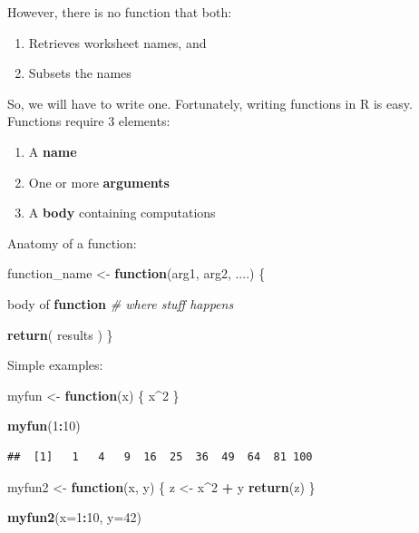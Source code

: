 \documentclass[
]{book}
\newenvironment{Shaded}{\begin{snugshade}}{\end{snugshade}}
\newcommand{\CommentTok}[1]{\textcolor[rgb]{0.56,0.35,0.01}{\textit{#1}}}
\newcommand{\ControlFlowTok}[1]{\textcolor[rgb]{0.13,0.29,0.53}{\textbf{#1}}}
\newcommand{\DataTypeTok}[1]{\textcolor[rgb]{0.13,0.29,0.53}{#1}}
\newcommand{\DecValTok}[1]{\textcolor[rgb]{0.00,0.00,0.81}{#1}}
\newcommand{\KeywordTok}[1]{\textcolor[rgb]{0.13,0.29,0.53}{\textbf{#1}}}
\newcommand{\NormalTok}[1]{#1}
\newcommand{\OperatorTok}[1]{\textcolor[rgb]{0.81,0.36,0.00}{\textbf{#1}}}
\newcommand{\StringTok}[1]{\textcolor[rgb]{0.31,0.60,0.02}{#1}}
\providecommand{\tightlist}{%
  \setlength{\itemsep}{0pt}\setlength{\parskip}{0pt}}
\begin{document}
However, there is no function that both:

\begin{enumerate}
\def\labelenumi{\arabic{enumi}.}
\tightlist
\item
  Retrieves worksheet names, and
\item
  Subsets the names
\end{enumerate}

So, we will have to write one. Fortunately, writing functions in R is easy.
Functions require 3 elements:

\begin{enumerate}
\def\labelenumi{\arabic{enumi}.}
\tightlist
\item
  A \textbf{name}
\item
  One or more \textbf{arguments}
\item
  A \textbf{body} containing computations
\end{enumerate}

Anatomy of a function:

\begin{Shaded}
\begin{Highlighting}[]
\NormalTok{function\_name \textless{}{-}}\StringTok{ }\ControlFlowTok{function}\NormalTok{(arg1, arg2, ....) \{}
  
\NormalTok{    body of }\ControlFlowTok{function} \CommentTok{\# where stuff happens }

    \KeywordTok{return}\NormalTok{( results ) }
\NormalTok{\}}
\end{Highlighting}
\end{Shaded}

Simple examples:

\begin{Shaded}
\begin{Highlighting}[]
\NormalTok{myfun \textless{}{-}}\StringTok{ }\ControlFlowTok{function}\NormalTok{(x) \{}
\NormalTok{  x}\OperatorTok{\^{}}\DecValTok{2}
\NormalTok{\}}

\KeywordTok{myfun}\NormalTok{(}\DecValTok{1}\OperatorTok{:}\DecValTok{10}\NormalTok{)}
\end{Highlighting}
\end{Shaded}

\begin{verbatim}
##  [1]   1   4   9  16  25  36  49  64  81 100
\end{verbatim}

\begin{Shaded}
\begin{Highlighting}[]
\NormalTok{myfun2 \textless{}{-}}\StringTok{ }\ControlFlowTok{function}\NormalTok{(x, y) \{}
\NormalTok{  z \textless{}{-}}\StringTok{ }\NormalTok{x}\OperatorTok{\^{}}\DecValTok{2} \OperatorTok{+}\StringTok{ }\NormalTok{y}
  \KeywordTok{return}\NormalTok{(z)}
\NormalTok{\}}

\KeywordTok{myfun2}\NormalTok{(}\DataTypeTok{x=}\DecValTok{1}\OperatorTok{:}\DecValTok{10}\NormalTok{, }\DataTypeTok{y=}\DecValTok{42}\NormalTok{)}
\end{Highlighting}
\end{Shaded}
\end{document}
